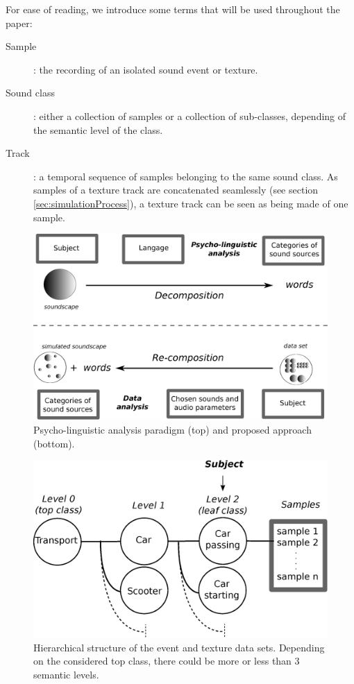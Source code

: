 \documentclass[twoside,twocolumn]{article}
\begin{document}
For ease of reading, we introduce some terms that will be used throughout the paper:

\begin{description}
\item[Sample]: the recording of an isolated sound event or texture.
\item[Sound class]: either a collection of samples or a collection of sub-classes, depending of the semantic level of the class.
\item[Track]: a temporal sequence of samples belonging to the same sound class. As samples of a texture track are concatenated seamlessly (see section \ref{sec:simulationProcess}), a texture track can be seen as being made of one sample.
\end{description}

\begin{figure}[t]
\begin{center}
\includegraphics[width=.4\paperwidth]{../gfx/1.eps}
  \caption{\label{psycholing} Psycho-linguistic analysis paradigm (top) and proposed approach (bottom).}
  \end{center}
\end{figure}

\begin{figure}[t!]
\begin{center}
\includegraphics[width=.4\paperwidth]{../gfx/3.eps}
\caption{\label{datasetexample} Hierarchical structure of the event and texture data sets. Depending on the considered top class, there could be more or less than 3 semantic levels.}
\end{center}
\end{figure}
\end{document}
